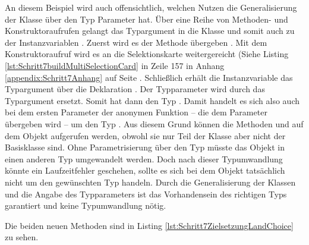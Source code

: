 An diesem Beispiel wird auch offensichtlich,
welchen Nutzen die Generalisierung der Klasse  über den Typ Parameter  hat.
Über eine Reihe von Methoden- und Konstruktoraufrufen gelangt das Typargument  in die Klasse  und somit auch zu der Instanzvariablen . Zuerst wird es der Methode  übergeben . 
Mit dem Konstruktoraufruf  wird es an die Selektionskarte weitergereicht (Siehe Listing \ref{lst:Schritt7buildMultiSelectionCard} in Zeile 157 in Anhang \ref{appendix:Schritt7Anhang} auf Seite \pageref{lst:Schritt7buildMultiSelectionCard}.
Schließlich erhält die Instanzvariable das Typargument über die Deklaration  .
Der Typparameter wird durch das Typargument ersetzt.
Somit hat  dann den Typ .
Damit handelt es sich also auch bei dem ersten Parameter  der anonymen Funktion --
die dem Parameter  übergeben wird  -- um den Typ .
Aus diesem Grund können die Methoden   und   auf dem Objekt  aufgerufen werden,
obwohl sie nur Teil der Klasse  aber nicht der Basisklasse  sind.
Ohne Parametrisierung über den Typ müsste das Objekt  in einen anderen Typ umgewandelt werden.
Doch nach dieser Typumwandlung könnte ein Laufzeitfehler geschehen, sollte es sich bei dem Objekt tatsächlich nicht um den gewünschten Typ handeln.
Durch die Generalisierung der Klassen und die Angabe des Typparameters ist das Vorhandensein des richtigen Typs garantiert und keine Typumwandlung nötig.

Die beiden neuen Methoden sind in Listing \ref{lst:Schritt7ZielsetzungLandChoice} zu sehen.


